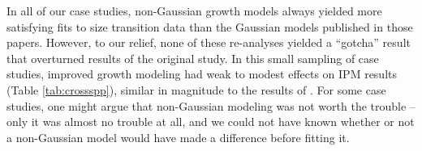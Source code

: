 \documentclass[12pt]{article}
\begin{document}
\begin{spacing}{1.9}
In all of our case studies, non-Gaussian growth models always yielded more satisfying fits to size transition data than the Gaussian models published in those papers. 
However, to our relief, none of these re-analyses yielded a ``gotcha'' result that overturned results of the original study. 
In this small sampling of case studies, improved growth modeling had weak to modest effects on IPM results (Table \ref{tab:crossspp}), similar in magnitude to the results of \cite{peterson2019improving}. 
For some case studies, one might argue that non-Gaussian modeling was not worth the trouble -- only it was almost no trouble at all, and we could not have known whether or not a non-Gaussian model would have made a difference before fitting it.


\end{spacing}
\end{document}
